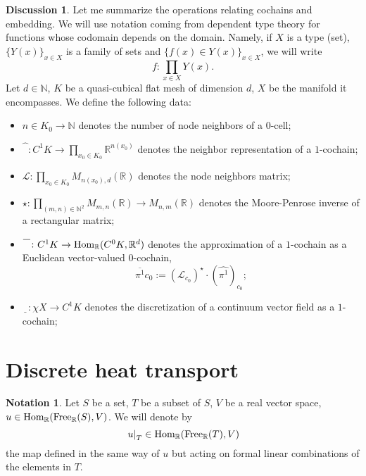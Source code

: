 \documentclass[fleqn]{article}
\theoremstyle{definition}
\newtheorem{notation}[theorem]{Notation}
\newtheorem{discussion}[theorem]{Discussion}
\newcommand{\N}{\mathbb{N}}
\newcommand{\R}{\mathbb{R}}
\newcommand{\restrict}[2]{\left. #1 \right|_{#2}}
\newcommand{\Hom}{\mathop{\rm Hom}\nolimits}
\begin{document}
\begin{discussion}
  Let me summarize the operations relating cochains and embedding.
  We will use notation coming from dependent type theory for functions whose
  codomain depends on the domain.
  Namely, if
    $X$ is a type (set),
    $\{Y(x)\}_{x \in X}$ is a family of sets and
    $\{f(x) \in Y(x)\}_{x \in X}$,
  we will write
  \begin{equation}
    f \colon \prod_{x \in X} Y(x).
  \end{equation}
  Let
    $d \in \N$,
    $K$ be a quasi-cubical flat mesh of dimension $d$,
    $X$ be the manifold it encompasses.
  We define the following data:
  \begin{itemize}
    \item
      $n \in K_0 \to \N$ denotes the number of node neighbors of a $0$-cell;
    \item
      $\widehat{\phantom{T}} \colon C^1 K \to
        \displaystyle \prod_{x_0 \in K_0} \R^{n(x_0)}$
      denotes the neighbor representation of a $1$-cochain;
    \item
      $\displaystyle
        \mathcal{L} \colon \prod_{x_0 \in K_0} M_{n(x_0), d}(\R)$
      denotes the node neighbors matrix;
    \item
      $\displaystyle
        \star \colon \prod_{(m, n) \in \N^2} M_{m, n}(\R) \to M_{n, m}(\R)$
      denotes the Moore-Penrose inverse of a rectangular matrix;
    \item
      $\overline{\phantom{T}} \colon C^1 K \to \Hom_\R(C^0 K, \R^d)$
      denotes the approximation of a $1$-cochain as a Euclidean vector-valued
      $0$-cochain,
      \begin{equation}
        \overline{\pi^1} c_0 :=
        (\mathcal{L}_{c_0})^\star \cdot (\widehat{\pi^1})_{c_0};
      \end{equation}
    \item
      $\underline{\phantom{T}} \colon \chi X \to C^1 K$
      denotes the discretization of a continuum vector field as a $1$-cochain;
  \end{itemize}
\end{discussion}

\section{Discrete heat transport}

\begin{notation}
  Let
    $S$ be a set,
    $T$ be a subset of $S$,
    $V$ be a real vector space,
    $u \in \Hom_\R({\rm Free}_\R(S), V)$.
  We will denote by
  \begin{equation}
    \restrict{u}{T} \in \Hom_\R({\rm Free}_\R(T), V)
  \end{equation}
  the map defined in the same way of $u$ but acting on formal linear
  combinations of the elements in $T$.
\end{notation}
\end{document}
